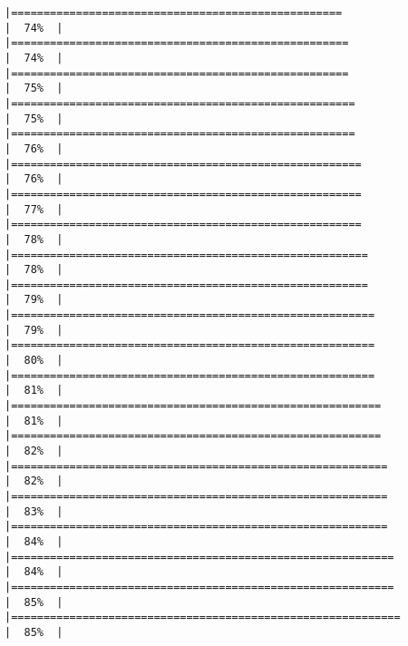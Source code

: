 \documentclass[
]{article}
\begin{document}
\begin{verbatim}
|===================================================                   |  74%  |                                                                              |====================================================                  |  74%  |                                                                              |====================================================                  |  75%  |                                                                              |=====================================================                 |  75%  |                                                                              |=====================================================                 |  76%  |                                                                              |======================================================                |  76%  |                                                                              |======================================================                |  77%  |                                                                              |======================================================                |  78%  |                                                                              |=======================================================               |  78%  |                                                                              |=======================================================               |  79%  |                                                                              |========================================================              |  79%  |                                                                              |========================================================              |  80%  |                                                                              |========================================================              |  81%  |                                                                              |=========================================================             |  81%  |                                                                              |=========================================================             |  82%  |                                                                              |==========================================================            |  82%  |                                                                              |==========================================================            |  83%  |                                                                              |==========================================================            |  84%  |                                                                              |===========================================================           |  84%  |                                                                              |===========================================================           |  85%  |                                                                              |============================================================          |  85%  |                                                                              
\end{verbatim}
\end{document}
